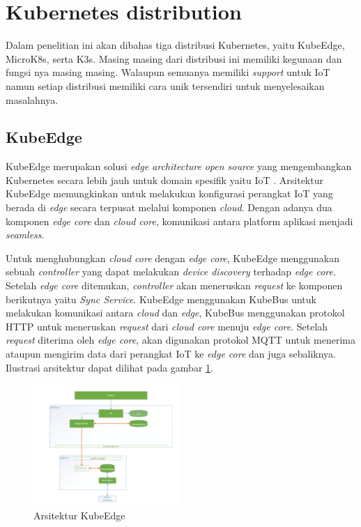 \section{Kubernetes distribution}
Dalam penelitian ini akan dibahas tiga distribusi Kubernetes, yaitu KubeEdge, MicroK8s, serta K3s. Masing masing dari distribusi ini memiliki kegunaan dan fungsi nya masing masing. Walaupun semuanya memiliki \textit{support} untuk IoT namun setiap distribusi memiliki cara unik tersendiri untuk menyelesaikan masalahnya.

\subsection{KubeEdge}
KubeEdge merupakan solusi \textit{edge architecture} \textit{open source} yang mengembangkan Kubernetes secara lebih jauh untuk domain spesifik yaitu IoT \parencite{kubeedge}. Arsitektur KubeEdge memungkinkan untuk melakukan konfigurasi perangkat IoT yang berada di \textit{edge} secara terpusat melalui komponen \textit{cloud}. Dengan adanya dua komponen \textit{edge core} dan \textit{cloud core}, komunikasi antara platform aplikasi menjadi \textit{seamless}.

Untuk menghubungkan \textit{cloud core} dengan \textit{edge core}, KubeEdge menggunakan sebuah \textit{controller} yang dapat melakukan \textit{device discovery} terhadap \textit{edge core}. Setelah \textit{edge core} ditemukan, \textit{controller} akan meneruskan \textit{request} ke komponen berikutnya yaitu \textit{Sync Service}. KubeEdge menggunakan KubeBus untuk melakukan komunikasi antara \textit{cloud} dan \textit{edge}, KubeBus menggunakan protokol HTTP untuk meneruskan \textit{request} dari \textit{cloud core} menuju \textit{edge core}. Setelah \textit{request} diterima oleh \textit{edge core}, akan digunakan protokol MQTT untuk menerima ataupun mengirim data dari perangkat IoT ke \textit{edge core} dan juga sebaliknya. Ilustrasi arsitektur dapat dilihat pada gambar \ref*{fig:arsitektur-kube-edge}.

\begin{figure}[ht]
  \centering
  \includegraphics[width=0.5\textwidth]{resources/chapter-2/arsitektur-kube-edge.jpg}
  \caption{Arsitektur KubeEdge \parencite{kubeedge}}
  \label{fig:arsitektur-kube-edge}
\end{figure}

